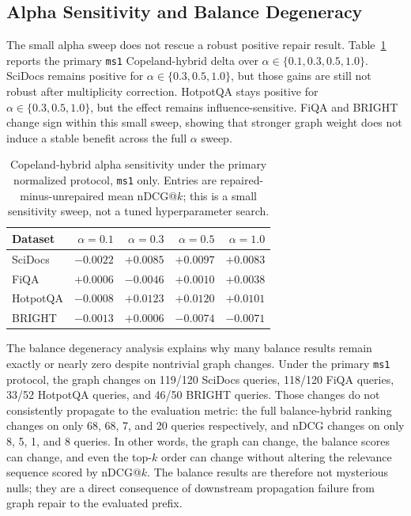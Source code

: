 \documentclass[manuscript,anonymous,review]{acmart}
\begin{document}
\subsection{Alpha Sensitivity and Balance Degeneracy}

The small alpha sweep does not rescue a robust positive repair result.
Table~\ref{tab:alpha-sensitivity} reports the primary \texttt{ms1}
Copeland-hybrid delta over $\alpha\in\{0.1, 0.3, 0.5, 1.0\}$. SciDocs remains
positive for $\alpha\in\{0.3,0.5,1.0\}$, but those gains are still not robust
after multiplicity correction. HotpotQA stays positive for
$\alpha\in\{0.3,0.5,1.0\}$, but the effect remains influence-sensitive. FiQA
and BRIGHT change sign within this small sweep, showing that stronger graph
weight does not induce a stable benefit across the full $\alpha$ sweep.

\begin{table}[t]
  \caption{Copeland-hybrid alpha sensitivity under the primary normalized
    protocol, \texttt{ms1} only. Entries are repaired-minus-unrepaired mean
    nDCG@$k$; this is a small sensitivity sweep, not a tuned hyperparameter
    search.}
  \label{tab:alpha-sensitivity}
  \begin{tabular}{lrrrr}
    \toprule
    Dataset & $\alpha=0.1$ & $\alpha=0.3$ & $\alpha=0.5$ & $\alpha=1.0$ \\
    \midrule
    SciDocs  & $-0.0022$ & $+0.0085$ & $+0.0097$ & $+0.0083$ \\
    FiQA     & $+0.0006$ & $-0.0046$ & $+0.0010$ & $+0.0038$ \\
    HotpotQA & $-0.0008$ & $+0.0123$ & $+0.0120$ & $+0.0101$ \\
    BRIGHT   & $-0.0013$ & $+0.0006$ & $-0.0074$ & $-0.0071$ \\
    \bottomrule
  \end{tabular}
\end{table}

The balance degeneracy analysis explains why many balance results remain exactly
or nearly zero despite nontrivial graph changes. Under the primary
\texttt{ms1} protocol, the graph changes on 119/120 SciDocs queries, 118/120
FiQA queries, 33/52 HotpotQA queries, and 46/50 BRIGHT queries. Those changes
do not consistently propagate to the evaluation metric: the full
balance-hybrid ranking changes on only 68, 68, 7, and 20 queries respectively,
and nDCG changes on only 8, 5, 1, and 8 queries. In other words, the graph can
change, the balance scores can change, and even the top-$k$ order can change
without altering the relevance sequence scored by nDCG@$k$. The balance results
are therefore not mysterious nulls; they are a direct consequence of
downstream propagation failure from graph repair to the evaluated prefix.
\end{document}
